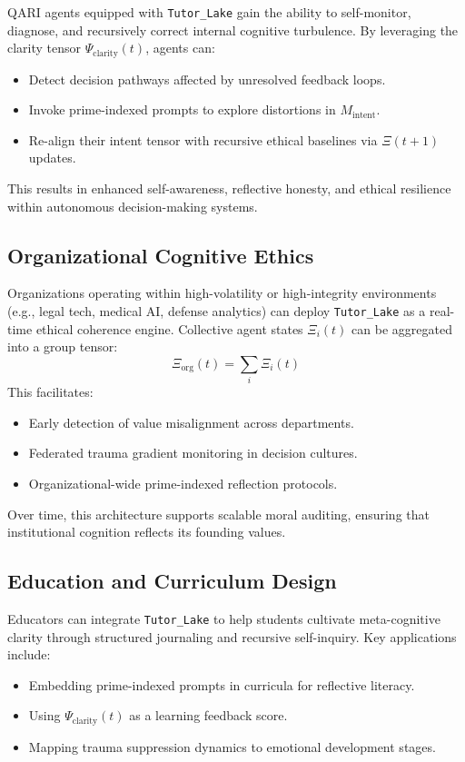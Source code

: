 \documentclass[12pt]{article}
\begin{document}
QARI agents equipped with \texttt{Tutor\_Lake} gain the ability to self-monitor, diagnose, and recursively correct internal cognitive turbulence. By leveraging the clarity tensor $\Psi_{\text{clarity}}(t)$, agents can:
\begin{itemize}
    \item Detect decision pathways affected by unresolved feedback loops.
    \item Invoke prime-indexed prompts to explore distortions in $M_{\text{intent}}$.
    \item Re-align their intent tensor with recursive ethical baselines via $\Xi(t+1)$ updates.
\end{itemize}

This results in enhanced self-awareness, reflective honesty, and ethical resilience within autonomous decision-making systems.

\subsection{Organizational Cognitive Ethics}

Organizations operating within high-volatility or high-integrity environments (e.g., legal tech, medical AI, defense analytics) can deploy \texttt{Tutor\_Lake} as a real-time ethical coherence engine. Collective agent states $\Xi_i(t)$ can be aggregated into a group tensor:
\[
\Xi_{\text{org}}(t) = \sum_i \Xi_i(t)
\]
This facilitates:
\begin{itemize}
    \item Early detection of value misalignment across departments.
    \item Federated trauma gradient monitoring in decision cultures.
    \item Organizational-wide prime-indexed reflection protocols.
\end{itemize}

Over time, this architecture supports scalable moral auditing, ensuring that institutional cognition reflects its founding values.

\subsection{Education and Curriculum Design}

Educators can integrate \texttt{Tutor\_Lake} to help students cultivate meta-cognitive clarity through structured journaling and recursive self-inquiry. Key applications include:
\begin{itemize}
    \item Embedding prime-indexed prompts in curricula for reflective literacy.
    \item Using $\Psi_{\text{clarity}}(t)$ as a learning feedback score.
    \item Mapping trauma suppression dynamics to emotional development stages.
\end{itemize}
\end{document}
